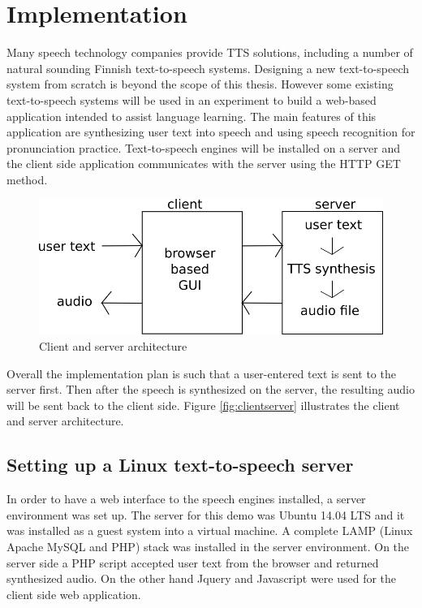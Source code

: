 \documentclass[11pt,a4paper,oneside,article]{memoir}
\begin{document}
\clearpage
\chapter{Implementation}

Many speech technology companies provide TTS solutions, including a number of natural sounding Finnish text-to-speech systems. Designing a new text-to-speech system from scratch is beyond the scope of this thesis. However some existing text-to-speech systems will be used in an experiment to build a web-based application intended to assist language learning. The main features of this application are synthesizing user text into speech and using speech recognition for pronunciation practice. Text-to-speech engines will be installed on a server and the client side application communicates with the server using the HTTP GET method. 

\begin{figure}[h]
  \includegraphics[width=12cm]{clientserver}
  \caption{Client and server architecture}
  \label{fig:clientserver}
\end{figure}

Overall the implementation plan is such that a user-entered text is sent to the server first. Then after the speech is synthesized on the server, the resulting audio will be sent back to the client side. Figure \vref{fig:clientserver} illustrates the client and server architecture.

\section{Setting up a Linux text-to-speech server }
In order to have a web interface to the speech engines installed, a server environment was set up. The server for this demo was Ubuntu 14.04 LTS and it was installed as a guest system into a virtual machine. A complete LAMP (Linux Apache MySQL and PHP) stack was installed in the server environment. On the server side a PHP script accepted user text from the browser and returned synthesized audio. On the other hand Jquery and Javascript were used for the client side web application. 
\end{document}

